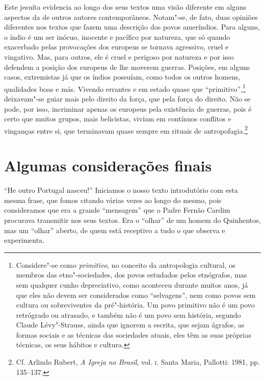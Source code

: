  Este jesuíta evidencia ao longo dos seus textos uma visão diferente
em alguns aspectos da de outros autores contemporâneos. Notam"-se, de
fato, duas opiniões diferentes nos textos que fazem uma descrição dos
povos ameríndios. Para alguns, o índio é um ser inócuo, inocente e
pacífico por natureza, que só quando exacerbado pelas provocações dos
europeus se tornava agressivo, cruel e vingativo. Mas, para outros, ele
é cruel e perigoso por natureza e por isso defendem a posição dos
europeus de lhe moverem guerras. Posições, em alguns casos, extremistas já que os índios possuíam,
como todos os outros homens, qualidades boas e más. Vivendo errantes e
em estado quase que ``primitivo'',\footnote{ Considere"-se como
\textit{primitivo}, no conceito da antropologia cultural, os membros 
das etno"-sociedades, dos povos estudados pelos etnógrafos, mas
sem qualquer cunho depreciativo, como aconteceu durante muitos anos, já
que eles não devem ser considerados como ``selvagens'', nem como povos
sem cultura ou sobreviventes da pré"-história. Um povo primitivo não é
um povo retrógrado ou atrasado, e também não é um povo sem história,
segundo Claude Lévy"-Strauss, ainda que ignorem a escrita, que sejam
ágrafos, as formas sociais e as técnicas das sociedades atuais, eles têm as
suas próprias técnicas, os seus hábitos e cultura.} deixavam"-se guiar
mais pelo direito da força, que pela força do direito. Não se pode, por
isso, incriminar apenas os europeus pela existência de guerras, pois é
certo que muitos grupos, mais belicistas, viviam em contínuos
conflitos e vinganças entre si, que terminavam quase sempre em rituais
de antropofagia.\footnote{ Cf. Arlindo Rubert, \textit{A Igreja
no Brasil}, vol. \textsc{i}. Santa Maria, Pallotti: 1981, pp. 135--137.} 

\section*{Algumas considerações finais}

``He outro Portugal nasceu!'' Iniciamos o nosso texto introdutório com esta mesma frase,
que fomos citando várias vezes ao longo do mesmo, pois consideramos que
era a grande ``mensagem'' que o Padre Fernão Cardim procurava transmitir
nos seus textos. Era o ``olhar'' de um homem do Quinhentos, mas um ``olhar'' 
aberto, de quem está receptivo a tudo o que observa e experimenta. 


